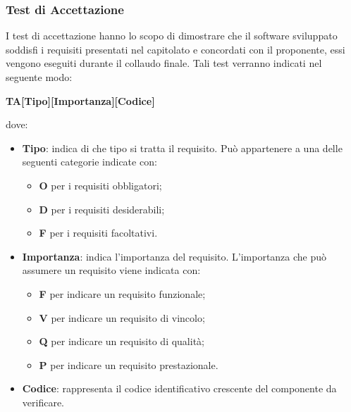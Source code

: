 \subsubsection{Test di Accettazione}
I test di accettazione hanno lo scopo di dimostrare che il software sviluppato 
soddisfi i requisiti presentati nel capitolato e concordati con il proponente, essi vengono eseguiti durante il
collaudo finale. Tali test verranno indicati nel seguente modo: \\
	\centerline{\textbf{TA[Tipo][Importanza][Codice]}}
dove:
\begin{itemize}
	\item \textbf{Tipo}: indica di che tipo si tratta il requisito. Può
		appartenere a una delle seguenti categorie indicate con:
		\begin{itemize}
			\item \textbf{O} per i requisiti obbligatori;
			\item \textbf{D} per i requisiti desiderabili;
			\item \textbf{F} per i requisiti facoltativi.			
		\end{itemize}
	\item \textbf{Importanza}: indica l'importanza del requisito. L'importanza
		che può assumere un requisito viene indicata con:
		\begin{itemize}
			\item \textbf{F} per indicare un requisito funzionale;
			\item \textbf{V} per indicare un requisito di vincolo;
			\item \textbf{Q} per indicare un requisito di qualità;
			\item \textbf{P} per indicare un requisito prestazionale. 
		\end{itemize}
	\item \textbf{Codice}: rappresenta il codice identificativo crescente
		del componente da verificare.
\end{itemize}



	\renewcommand{\arraystretch}{1.5}
	
